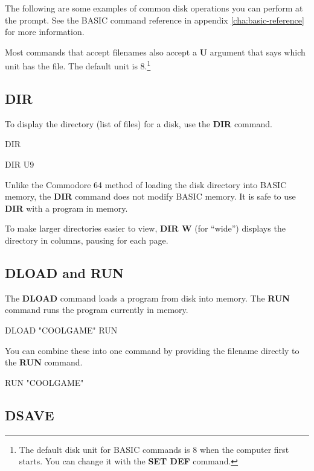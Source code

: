 The following are some examples of common disk operations you can perform at the  prompt. See the BASIC command reference in appendix \vref{cha:basic-reference} for more information.

Most commands that accept filenames also accept a {\bf U} argument that says which unit has the file. The default unit is 8.\footnote{The default disk unit for BASIC commands is 8 when the computer first starts. You can change it with the {\bf SET DEF} command.}

\subsection{DIR}

To display the directory (list of files) for a disk, use the {\bf DIR} command.

\begin{screenoutput}
DIR

DIR U9
\end{screenoutput}

Unlike the Commodore 64 method of loading the disk directory into BASIC memory, the {\bf DIR} command does not modify BASIC memory. It is safe to use {\bf DIR} with a program in memory.

To make larger directories easier to view, {\bf DIR W} (for ``wide'') displays the directory in columns, pausing for each page.

\subsection{DLOAD and RUN}

The {\bf DLOAD} command loads a program from disk into memory. The {\bf RUN} command runs the program currently in memory.

\begin{screenoutput}
DLOAD "COOLGAME"
RUN
\end{screenoutput}

You can combine these into one command by providing the filename directly to the {\bf RUN} command.

\begin{screenoutput}
RUN "COOLGAME"
\end{screenoutput}

\subsection{DSAVE}

